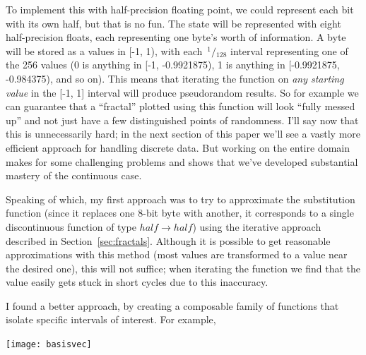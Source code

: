 \documentclass[twocolumn]{article}
\newcommand\sfrac[2]{\!{}\,^{#1}\!/{}\!_{#2}}
\begin{document}
To implement this with half-precision floating point, we could
represent each bit with its own half, but that is no fun. The state
will be represented with eight half-precision floats, each
representing one byte's worth of information. A byte will be stored as
a values in [-1, 1), with each $\sfrac{1}{128}$ interval representing
one of the 256 values (0 is anything in [-1, -0.9921875), 1 is
anything in [-0.9921875, -0.984375), and so on). This means that
iterating the function on {\em any starting value} in the [-1, 1]
interval will produce pseudorandom results. So for example
we can guarantee that a ``fractal'' plotted using this function
will look ``fully messed up'' and not just have a few
distinguished points of randomness.
I'll say now that this is unnecessarily hard; in the next
section of this paper we'll see a vastly more efficient
approach for handling discrete data. But working on the entire domain
makes for some challenging problems and shows that we've developed
substantial mastery of the continuous case.

Speaking of which, my first approach was to try to approximate the
substitution function (since it replaces one 8-bit byte with another,
it corresponds to a single discontinuous function of type $half
\rightarrow half$) using the iterative approach described in
Section~\ref{sec:fractals}. Although it is possible to get reasonable
approximations with this method (most values are transformed to a
value near the desired one), this will not suffice; when iterating the
function we find that the value easily gets stuck in short cycles due
to this inaccuracy.

I found a better approach, by creating a composable family of functions
that isolate specific intervals of interest. For example,

\texttt{[image: basisvec]}
\end{document}
